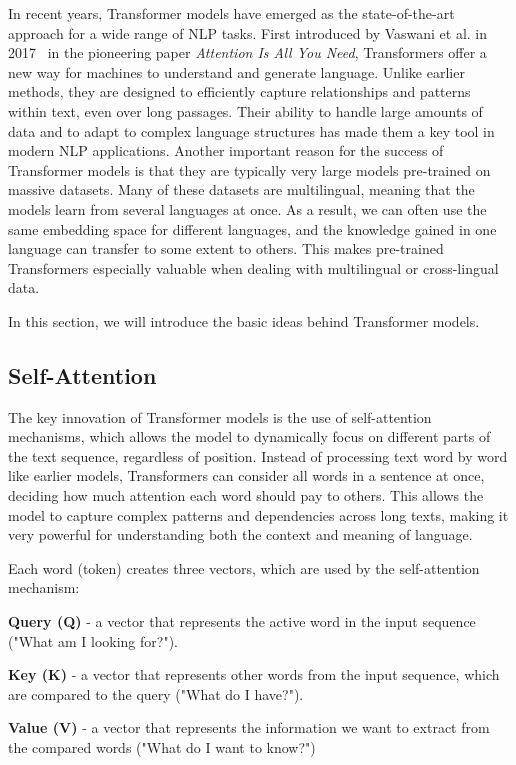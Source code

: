\documentclass[twoside]{ctuthesis}
\theoremstyle{plain}
\theoremstyle{definition}
\theoremstyle{note}
\begin{document}
In recent years, Transformer models have emerged as the state-of-the-art approach for a wide range of NLP tasks. First introduced by Vaswani et al. in 2017~\cite{Vaswani2017} in the pioneering paper \textit{Attention Is All You Need}, Transformers offer a new way for machines to understand and generate language. Unlike earlier methods, they are designed to efficiently capture relationships and patterns within text, even over long passages. Their ability to handle large amounts of data and to adapt to complex language structures has made them a key tool in modern NLP applications.
Another important reason for the success of Transformer models is that they are typically very large models pre-trained on massive datasets. Many of these datasets are multilingual, meaning that the models learn from several languages at once. As a result, we can often use the same embedding space for different languages, and the knowledge gained in one language can transfer to some extent to others. This makes pre-trained Transformers especially valuable when dealing with multilingual or cross-lingual data.\par
In this section, we will introduce the basic ideas behind Transformer models.\par

\subsection{Self-Attention}

The key innovation of Transformer models is the use of self-attention mechanisms, which allows the model to dynamically focus on different parts of the text sequence, regardless of position. Instead of processing text word by word like earlier models, Transformers can consider all words in a sentence at once, deciding how much attention each word should pay to others. This allows the model to capture complex patterns and dependencies across long texts, making it very powerful for understanding both the context and meaning of language.\par

Each word (token) creates three vectors, which are used by the self-attention mechanism:
\begin{list}{}{}
  \itemsep=0pt
  \item \textbf{Query (Q)} - a vector that represents the active word in the input sequence ("What am I looking for?").
  \item \textbf{Key (K)} - a vector that represents other words from the input sequence, which are compared to the query ("What do I have?").
  \item \textbf{Value (V)} - a vector that represents the information we want to extract from the compared words ("What do I want to know?")
\end{list}
\end{document}
